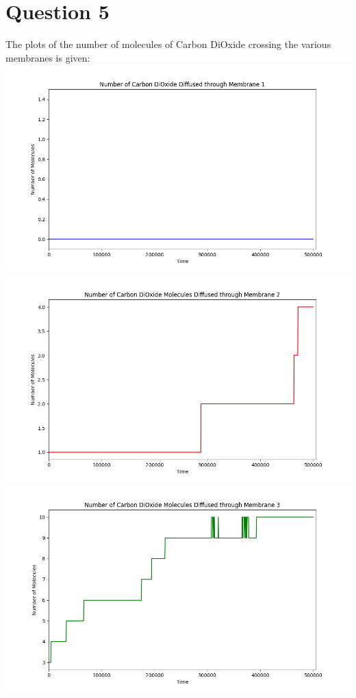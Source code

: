 \documentclass[11pt]{article}
\begin{document}
\section{Question 5}
The plots of the number of molecules of Carbon DiOxide crossing the various membranes is given:\\
\includegraphics[scale=0.5]{Q5M1.png} \\ 
\includegraphics[scale=0.5]{Q5M2.png} \\
\includegraphics[scale=0.5]{Q5M3.png} \\
\end{document}
